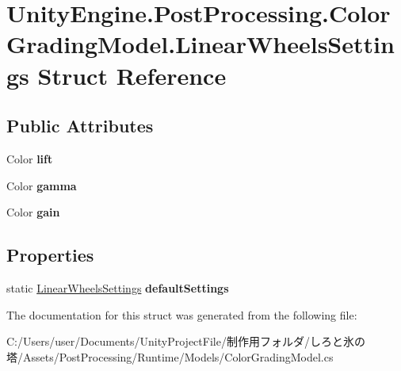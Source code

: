 \hypertarget{struct_unity_engine_1_1_post_processing_1_1_color_grading_model_1_1_linear_wheels_settings}{}\section{Unity\+Engine.\+Post\+Processing.\+Color\+Grading\+Model.\+Linear\+Wheels\+Settings Struct Reference}
\label{struct_unity_engine_1_1_post_processing_1_1_color_grading_model_1_1_linear_wheels_settings}
\subsection*{Public Attributes}
\begin{DoxyCompactItemize}
\item 
\mbox{\label{struct_unity_engine_1_1_post_processing_1_1_color_grading_model_1_1_linear_wheels_settings_a6d552fe0196a7b47687cc7c7467f94ae}} 
Color {\bfseries lift}
\item 
\mbox{\label{struct_unity_engine_1_1_post_processing_1_1_color_grading_model_1_1_linear_wheels_settings_a7d58d6b75b02b9c32a17eadf61ca3be8}} 
Color {\bfseries gamma}
\item 
\mbox{\label{struct_unity_engine_1_1_post_processing_1_1_color_grading_model_1_1_linear_wheels_settings_a283b912d257aa47d32d41d0b03e1e4a2}} 
Color {\bfseries gain}
\end{DoxyCompactItemize}
\subsection*{Properties}
\begin{DoxyCompactItemize}
\item 
\mbox{\label{struct_unity_engine_1_1_post_processing_1_1_color_grading_model_1_1_linear_wheels_settings_a6f56229efcbc3784f78c253221883a70}} 
static \hyperlink{struct_unity_engine_1_1_post_processing_1_1_color_grading_model_1_1_linear_wheels_settings}{Linear\+Wheels\+Settings} {\bfseries default\+Settings}
\end{DoxyCompactItemize}


The documentation for this struct was generated from the following file\+:\begin{DoxyCompactItemize}
\item 
C\+:/\+Users/user/\+Documents/\+Unity\+Project\+File/制作用フォルダ/しろと氷の塔/\+Assets/\+Post\+Processing/\+Runtime/\+Models/Color\+Grading\+Model.\+cs\end{DoxyCompactItemize}
